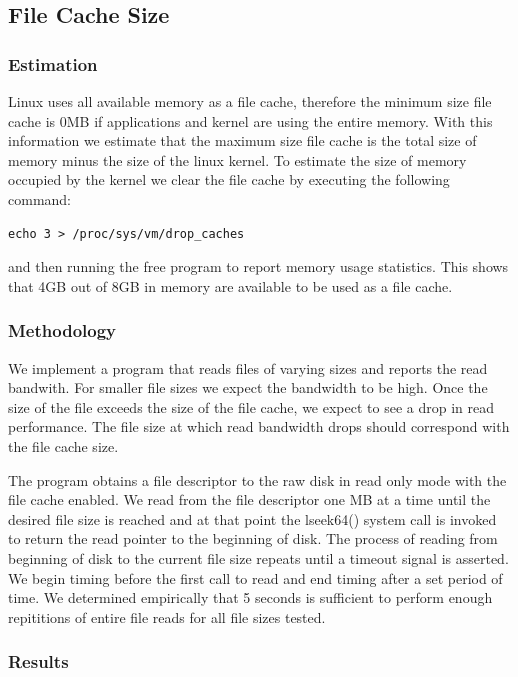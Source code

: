 \subsection{File Cache Size}

\subsubsection{Estimation}

Linux uses all available memory as a file cache, therefore the minimum size
file cache is 0MB if applications and kernel are using the entire memory. With this information we estimate that the maximum size file cache is the 
total size of memory minus the size of the linux kernel. To estimate the size of memory occupied by the kernel we clear the file cache by executing 
the following command:
\begin{verbatim}
echo 3 > /proc/sys/vm/drop_caches
\end{verbatim}
and then running the free program to report memory usage statistics. This shows that 4GB out of 8GB in memory are available to be used as a file cache.

\subsubsection{Methodology}

We implement a program that reads files of varying sizes and reports the read bandwith. For smaller file
sizes we expect the bandwidth to be high. Once the size of the file exceeds the size of the file cache,
we expect to see a drop in read performance. The file size at which read bandwidth drops should 
correspond with the file cache size.

The program obtains a file descriptor to the raw disk in read only mode with the file cache enabled. 
We read from the file descriptor one MB at a time until the desired file size is reached and at that 
point the lseek64() system call is invoked to return the read pointer to the beginning of disk. The process of reading from beginning of disk to the current file size repeats until a timeout signal is asserted.
We begin timing before the first call to read and end timing after a set period of time. We determined 
empirically that 5 seconds is sufficient to perform enough repititions of entire file reads for all 
file sizes tested.

\subsubsection{Results}


